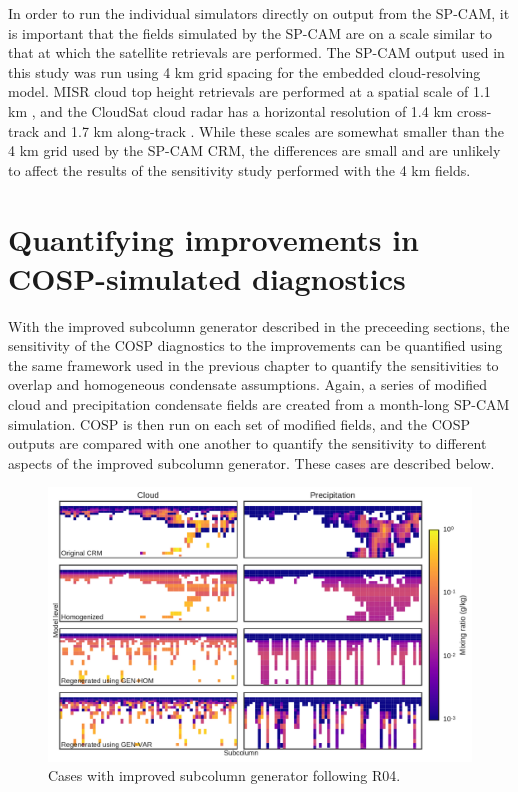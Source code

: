 In order to run the individual simulators directly on output from the SP-CAM, it is important that the fields simulated by the SP-CAM are on a scale similar to that at which the satellite retrievals are performed. The SP-CAM output used in this study was run using 4 km grid spacing for the embedded cloud-resolving model. MISR cloud top height retrievals are performed at a spatial scale of 1.1 km \citep{moroney_et_al_2002}, and the CloudSat cloud radar has a horizontal resolution of 1.4 km cross-track and 1.7 km along-track \citep{tanelli_et_al_2008}. While these scales are somewhat smaller than the 4 km grid used by the SP-CAM CRM, the differences are small and are unlikely to affect the results of the sensitivity study performed with the 4 km fields.

\section{Quantifying improvements in COSP-simulated diagnostics}
\label{subgrid2_results_section}
With the improved subcolumn generator described in the preceeding sections, the sensitivity of the COSP diagnostics to the improvements can be quantified using the same framework used in the previous chapter to quantify the sensitivities to overlap and homogeneous condensate assumptions. Again, a series of modified cloud and precipitation condensate fields are created from a month-long SP-CAM simulation. COSP is then run on each set of modified fields, and the COSP outputs are compared with one another to quantify the sensitivity to different aspects of the improved subcolumn generator. These cases are described below.

\begin{figure}
\centering
\includegraphics[width=\columnwidth]{graphics/mxratio_gen-var.pdf}
\caption{Cases with improved subcolumn generator following R04.}
\label{mxratio_gen-var}
\end{figure}

